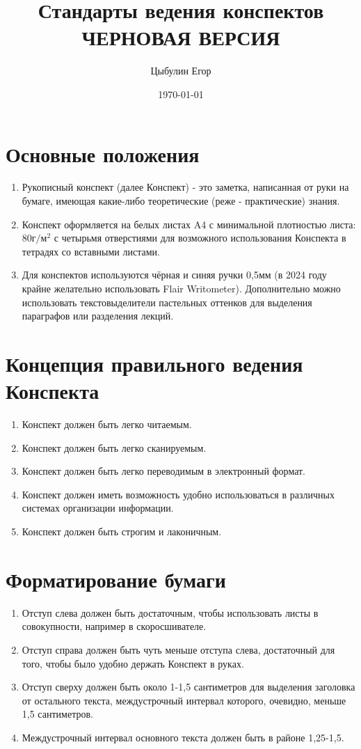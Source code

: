 \documentclass[a4paper]{article}
\title{Стандарты ведения конспектов ЧЕРНОВАЯ ВЕРСИЯ}
\author{Цыбулин Егор}
\date{\today}
\theoremstyle{plain}
\theoremstyle{definition}
\theoremstyle{remark}
\begin{document}
    \maketitle
    \section{Основные положения}
    \begin{enumerate}
        \item Рукописный конспект (далее Конспект) - это заметка, написанная от руки на бумаге, имеющая какие-либо теоретические (реже - практические) знания.
        \item Конспект оформляется на белых листах A4 с минимальной плотностью листа: 80г$/$м$^2$ с четырьмя отверстиями для возможного использования Конспекта в тетрадях со вставными листами.
        \item Для конспектов используются чёрная и синяя ручки 0,5мм (в 2024 году крайне желательно использовать Flair Writometer). Дополнительно можно использовать текстовыделители пастельных оттенков для выделения параграфов или разделения лекций.
    \end{enumerate}


    \section{Концепция правильного ведения Конспекта}
    \begin{enumerate}
        \item Конспект должен быть легко читаемым.
        \item Конспект должен быть легко сканируемым.
        \item Конспект должен быть легко переводимым в электронный формат.
        \item Конспект должен иметь возможность удобно использоваться в различных системах организации информации.
        \item Конспект должен быть строгим и лаконичным.
    \end{enumerate}


    \section{Форматирование бумаги}
    \begin{enumerate}
        \item Отступ слева должен быть достаточным, чтобы использовать листы в совокупности, например в скоросшивателе.
        \item Отступ справа должен быть чуть меньше отступа слева, достаточный для того, чтобы было удобно держать Конспект в руках.
        \item Отступ сверху должен быть около 1-1,5 сантиметров для выделения заголовка от остального текста, междустрочный интервал которого, очевидно, меньше 1,5 сантиметров.
        \item Междустрочный интервал основного текста должен быть в районе 1,25-1,5.
    \end{enumerate}
\end{document}
